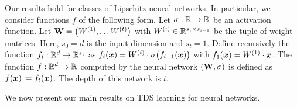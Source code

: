 \documentclass[11pt]{article} %
\numberwithin{equation}{section}
\begin{document}
    Our results hold for classes of Lipschitz neural networks. In particular, we consider functions $f$ of the following form. Let $\sigma:\mathbb{R}\to\mathbb{R}$ be an activation function. Let $\mathbf{W}=\left(W^{(1)},\ldots W^{(t)}\right)$ with $W^{(i)}\in \mathbb{R}^{s_i\times s_{i-1}}$ be the tuple of weight matrices. Here, $s_0=d$ is the input dimension and $s_{t}=1$. Define recursively the function $f_i:\mathbb{R}^{d}\to \mathbb{R}^{s_i}$ as $f_i({\bm{x}})=W^{(i)}\cdot \sigma\bigl(f_{i-1}({\bm{x}})\bigr)$ with $f_1({\bm{x}})=W^{(1)}\cdot{\bm{x}}$. The function $f:\mathbb{R}^d \to \mathbb{R}$ computed by the neural network $(\mathbf{W},\sigma)$ is defined as 
    $f({\bm{x}})\coloneq f_{t}({\bm{x}})$. %
    The depth of this network is $t$. 

    We now present our main results on TDS learning for neural networks. 



\end{document}
